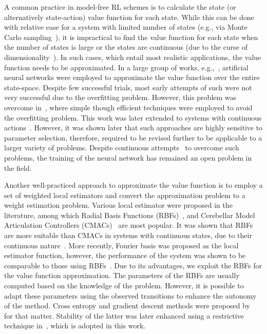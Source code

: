 \documentclass{ieeeaccess}
\begin{document}
A common practice in model-free RL schemes is to calculate the state (or alternatively state-action) value function for each state. While this can be done with relative ease for a system with limited number of states (e.g., via Monte Carlo sampling~\cite{4}), it is impractical to find the value function for each state when the number of states is large or the states are continuous (due to the curse of dimensionality~\cite{5}). In such cases, which entail most realistic applications, the value function needs to be approximated. In a large group of works, e.g.,~\cite{6,Tang, Hu, Kim, Xie}, artificial neural networks were employed to approximate the value function over the entire state-space. Despite few successful trials, most early attempts of such were not very successful due to the overfitting problem. However, this problem was overcome in~\cite{7}, where simple though efficient techniques were employed to avoid the overfitting problem. This work was later extended to systems with continuous actions~\cite{8}. However, it was shown later that such approaches are highly sensitive to parameter selection, therefore, required to be revised further to be applicable to a larger variety of problems. Despite continuous attempts~\cite{9, 10, 11, 12} to overcome such problems, the training of the neural network has remained an open problem in the field.

Another well-practiced approach to approximate the value function is to employ a set of weighted local estimators and convert the approximation problem to a weight estimation problem. Various local estimator were proposed in the literature, among which Radial Basis Functions (RBFs)~\cite{13}, and Cerebellar Model Articulation Controllers (CMACs)~\cite{14} are most popular. It was shown that RBFs are more suitable than CMACs in systems with continuous states, due to their continuous nature~\cite{15}. More recently, Fourier basis was proposed as the local estimator function, however, the performance of the system was shown to be comparable to those using RBFs~\cite{16}. Due to its advantages, we exploit the RBFs for the value function approximation. The parameters of the RBFs are usually computed based on the knowledge of the problem. However, it is possible to adapt these parameters using the observed transitions to enhance the autonomy of the method. Cross entropy and gradient descent methods were proposed by~\cite{17} for that matter. Stability of the latter was later enhanced using a restrictive technique in~\cite{18}, which is adopted in this work.
\end{document}
